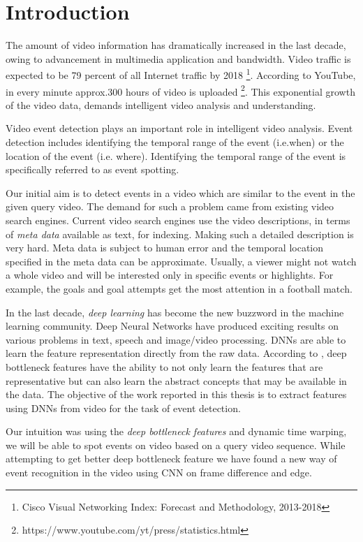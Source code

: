 \chapter{Introduction}
\label{chap:intro}

The amount of video information has dramatically increased in the last decade, owing to advancement in multimedia application and bandwidth. Video traffic is expected to be  79 percent of all Internet traffic by 2018 \footnote{Cisco Visual Networking Index: Forecast and Methodology, 2013-2018}. According to YouTube, in every minute approx.300 hours of video is uploaded \footnote{https://www.youtube.com/yt/press/statistics.html}. This exponential growth of the video data, demands intelligent video analysis and understanding.

Video event detection plays an important role in intelligent video analysis. Event detection includes identifying the temporal range of the event (i.e.when) or the location of the event (i.e. where). Identifying the temporal range of the event is specifically referred to as event spotting. 

Our initial aim is to detect events in a video which are similar to the event in the given query video. The demand for such a problem came from existing video search engines. Current video search engines use the video descriptions, in terms of  \textit{meta data} available as text, for indexing.  Making such a detailed description is very hard. Meta data is subject to human error and the temporal location specified in the meta data can be approximate. Usually, a viewer might not watch a whole video and will be interested only in specific events or highlights. For example, the goals and goal attempts get the most attention in a football match.

In the last decade, \textit{deep learning} has become the new buzzword in the machine learning community. Deep Neural Networks have produced exciting results on various problems in text, speech and image/video processing. DNNs are able to learn the feature representation directly from the raw data. According to \citet{hinton2009deep}, deep bottleneck features have the ability to not only learn the features that are representative but can also learn the abstract concepts that may be available in the data.   The objective of the work reported in this thesis is to extract features using DNNs from video for the task of event detection.

Our intuition was using the \textit{deep bottleneck features} and dynamic time warping, we will be able to spot events on video based on a query video sequence. While attempting  to get better deep bottleneck feature we have found a new  way of event recognition in the video using CNN on frame difference and edge.

